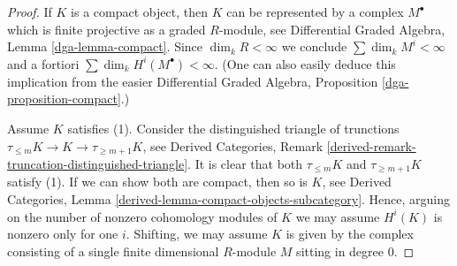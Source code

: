 \documentclass{stacks-project}
\theoremstyle{plain}
\theoremstyle{definition}
\theoremstyle{remark}
\numberwithin{equation}{subsection}
\begin{document}
\begin{proof}
If $K$ is a compact object, then $K$ can be represented by a complex
$M^\bullet$ which is finite projective as a graded $R$-module, see
Differential Graded Algebra, Lemma \ref{dga-lemma-compact}.
Since $\dim_k R < \infty$ we conclude $\sum \dim_k M^i < \infty$
and a fortiori $\sum \dim_k H^i(M^\bullet) < \infty$.
(One can also easily deduce this implication from the easier
Differential Graded Algebra, Proposition \ref{dga-proposition-compact}.)

\medskip\noindent
Assume $K$ satisfies (1). Consider the distinguished triangle
of trunctions $\tau_{\leq m}K \to K \to \tau_{\geq m + 1}K$, see
Derived Categories, Remark
\ref{derived-remark-truncation-distinguished-triangle}.
It is clear that both $\tau_{\leq m}K$ and $\tau_{\geq m + 1} K$
satisfy (1). If we can show both are compact, then so is $K$, see
Derived Categories, Lemma \ref{derived-lemma-compact-objects-subcategory}.
Hence, arguing on the number of nonzero cohomology modules of $K$
we may assume $H^i(K)$ is nonzero only for one $i$.
Shifting, we may assume $K$ is given by the complex
consisting of a single finite dimensional $R$-module $M$ sitting
in degree $0$.


\end{proof}
\end{document}
